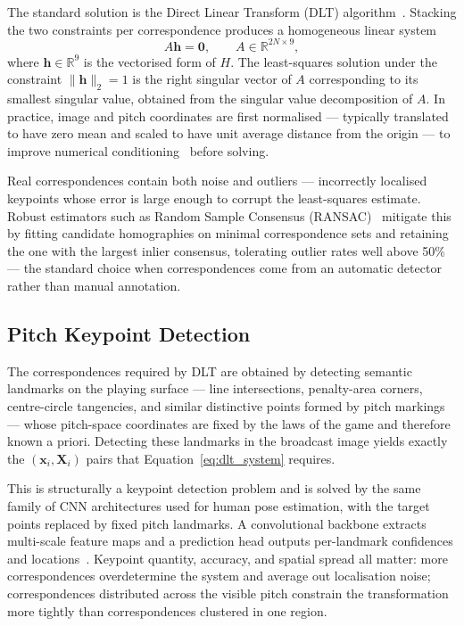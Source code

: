 The standard solution is the Direct Linear Transform (DLT) 
algorithm~\cite{hartley2003multiple}. Stacking the two 
constraints per correspondence produces a homogeneous 
linear system
\begin{equation}
    A\mathbf{h} = \mathbf{0},
    \qquad
    A \in \mathbb{R}^{2N \times 9},
    \label{eq:dlt_system}
\end{equation}
where \(\mathbf{h} \in \mathbb{R}^{9}\) is the vectorised 
form of \(H\). The least-squares solution under the 
constraint \(\lVert \mathbf{h} \rVert_2 = 1\) is the right 
singular vector of \(A\) corresponding to its smallest 
singular value, obtained from the singular value 
decomposition of \(A\). In practice, image and pitch 
coordinates are first normalised — typically translated to 
have zero mean and scaled to have unit average distance 
from the origin — to improve numerical 
conditioning~\cite{hartley2003multiple} before solving.

Real correspondences contain both noise and outliers — 
incorrectly localised keypoints whose error is large 
enough to corrupt the least-squares estimate. Robust 
estimators such as Random Sample Consensus (RANSAC)~\cite{fischler1981ransac}
mitigate this by fitting candidate homographies on minimal 
correspondence sets and retaining the one with the largest 
inlier consensus, tolerating outlier rates well above 
50\% — the standard choice when correspondences come from 
an automatic detector rather than manual annotation.

\subsection{Pitch Keypoint Detection}
\label{subsec:background_pitch_keypoints}

The correspondences required by DLT are obtained by 
detecting semantic landmarks on the playing surface — line 
intersections, penalty-area corners, centre-circle 
tangencies, and similar distinctive points formed by pitch 
markings — whose pitch-space coordinates are fixed by the 
laws of the game and therefore known a priori. Detecting 
these landmarks in the broadcast image yields exactly the 
\((\mathbf{x}_i, \mathbf{X}_i)\) pairs that 
Equation~\ref{eq:dlt_system} requires.

This is structurally a keypoint detection problem and is 
solved by the same family of CNN architectures used for 
human pose estimation, with the target points replaced by 
fixed pitch landmarks. A convolutional backbone extracts 
multi-scale feature maps and a prediction head outputs 
per-landmark confidences and 
locations~\cite{Jocher2023}. Keypoint quantity, accuracy, 
and spatial spread all matter: more correspondences 
overdetermine the system and average out localisation 
noise; correspondences distributed across the visible 
pitch constrain the transformation more tightly than 
correspondences clustered in one region.

